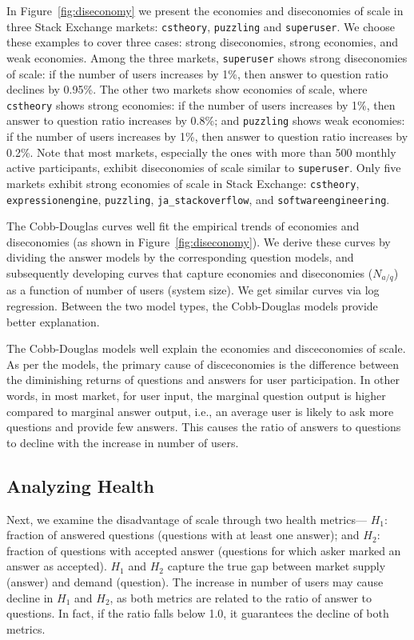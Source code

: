 In Figure~\ref{fig:diseconomy} we present the economies and diseconomies of scale in three Stack Exchange markets: \texttt{cstheory}, \texttt{puzzling} and \texttt{superuser}. We choose these examples to cover three cases: strong diseconomies, strong economies, and weak economies. Among the three markets, \texttt{superuser} shows strong diseconomies of scale: if the number of users increases by 1\%, then answer to question ratio declines by 0.95\%. The other two markets show economies of scale, where \texttt{cstheory} shows strong economies: if the number of users increases by 1\%, then answer to question ratio increases by 0.8\%; and \texttt{puzzling} shows weak economies: if the number of users increases by 1\%, then answer to question ratio increases by 0.2\%. Note that most markets, especially the ones with more than 500 monthly active participants, exhibit diseconomies of scale similar to \texttt{superuser}. Only five markets exhibit strong economies of scale in Stack Exchange: \texttt{cstheory}, \texttt{expressionengine}, \texttt{puzzling}, \texttt{ja\_stackoverflow}, and \texttt{softwareengineering}.

The Cobb-Douglas curves well fit the empirical trends of economies and diseconomies (as shown in Figure~\ref{fig:diseconomy}). We derive these curves by dividing the answer models by the corresponding question models, and subsequently developing curves that capture economies and diseconomies ($N_{a/q}$) as a function of number of users (system size). We get similar curves via log regression. Between the two model types, the Cobb-Douglas models provide better explanation.

The Cobb-Douglas models well explain the economies and disceconomies of scale. As per the models, the primary cause of disceconomies is the difference between the diminishing returns of questions and answers for user participation. In other words, in most market, for user input, the marginal question output is higher compared to marginal answer output, i.e., an average user is likely to ask more questions and provide few answers. This causes the ratio of answers to questions to decline with the increase in number of users. 

\subsection{Analyzing Health}
Next, we examine the disadvantage of scale through two health metrics--- $H_1:$ fraction of answered questions (questions with at least one answer); and $H_2:$ fraction of questions with accepted answer (questions for which asker marked an answer as accepted). $H_1$ and $H_2$ capture the true gap between market supply (answer) and demand (question). The increase in number of users may cause decline in $H_1$ and $H_2$, as both metrics are related to the ratio of answer to questions. In fact, if the ratio falls below 1.0, it guarantees the decline of both metrics. 

